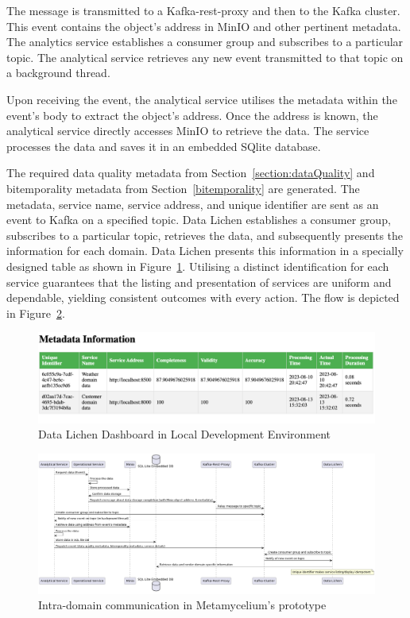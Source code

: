 \documentclass[preprint,12pt]{elsarticle}
\begin{document}
The message is transmitted to a Kafka-rest-proxy and then to the Kafka cluster. This event contains the object's address in MinIO and other pertinent metadata. The analytics service establishes a consumer group and subscribes to a particular topic. The analytical service retrieves any new event transmitted to that topic on a background thread. 

Upon receiving the event, the analytical service utilises the metadata within the event's body to extract the object's address. Once the address is known, the analytical service directly accesses MinIO to retrieve the data. The service processes the data and saves it in an embedded SQlite database. 

The required data quality metadata from Section~\ref{section:dataQuality} and bitemporality metadata from Section~\ref{bitemporality} are generated. The metadata, service name, service address, and unique identifier are sent as an event to Kafka on a specified topic. Data Lichen establishes a consumer group, subscribes to a particular topic, retrieves the data, and subsequently presents the information for each domain. Data Lichen presents this information in a specially designed table as shown in Figure~\ref{dataLichenDashboard}. Utilising a distinct identification for each service guarantees that the listing and presentation of services are uniform and dependable, yielding consistent outcomes with every action. The flow is depicted in Figure~\ref{intraDomain}.

\begin{figure}[h!]
  \centering
  \includegraphics[width=13cm]{images/Datalichen-dashboard.png}
  \caption{Data Lichen Dashboard in Local Development Environment} 
  \label{dataLichenDashboard}
\end{figure}

\begin{figure}[h!]
  \centering
  \includegraphics[width=\textwidth]{images/intra-domain-flow.jpg}
  \caption{Intra-domain communication in Metamycelium's prototype}
  \label{intraDomain}
\end{figure}
\end{document}
